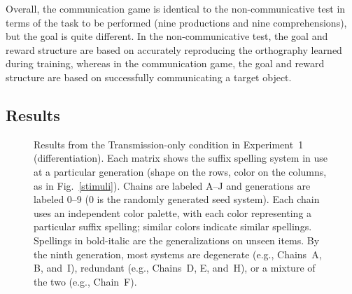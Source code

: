 \documentclass[doc,biblatex]{apa7}
\begin{document}
Overall, the communication game is identical to the non-communicative test in terms of the task to be performed (nine productions and nine comprehensions), but the goal is quite different. In the non-communicative test, the goal and reward structure are based on accurately reproducing the orthography learned during training, whereas in the communication game, the goal and reward structure are based on successfully communicating a target object.

\subsection{Results}

	\begin{figure}
	\vspace*{2pt}
	\caption{Results from the Transmission-only condition in Experiment~1 (differentiation). Each matrix shows the suffix spelling system in use at a particular generation (shape on the rows, color on the columns, as in Fig.~\ref{stimuli}). Chains are labeled A--J and generations are labeled 0–9 (0 is the randomly generated seed system). Each chain uses an independent color palette, with each color representing a particular suffix spelling; similar colors indicate similar spellings. Spellings in bold-italic are the generalizations on unseen items. By the ninth generation, most systems are degenerate (e.g., Chains~A, B, and~I), redundant (e.g., Chains~D, E, and~H), or a mixture of the two (e.g., Chain~F).}
	\label{dif_lrn}
	\end{figure}
\end{document}
